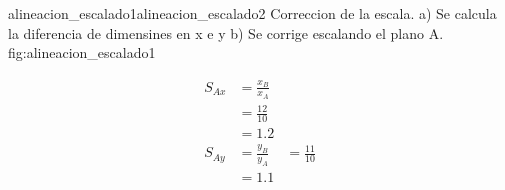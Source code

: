          {alineacion_escalado1}{alineacion_escalado2}
         {Correccion de la escala. a) Se calcula la diferencia de dimensines en x e y b) Se corrige escalando el plano A.}
         {fig:alineacion_escalado1}

         \begin{equation}
            \begin{aligned}
               S_{Ax} &= \frac{x_B}{x_A}\\
                      &= \frac{12}{10}\\
                      &= 1.2\\
               S_{Ay} &= \frac{y_B}{y_A}
                      &= \frac{11}{10}\\
                      &= 1.1\\
            \end{aligned}
            \label{eq:alineacion_escalado}
         \end{equation}



